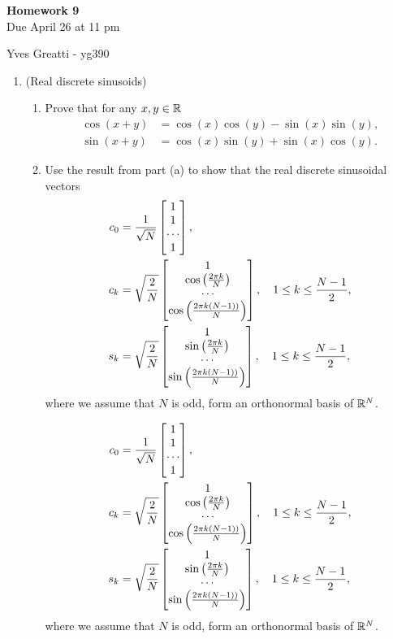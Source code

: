 \documentclass[12pt,twoside]{article}
\begin{document}
\begin{center}
{\large{\textbf{Homework 9}} } \vspace{0.2cm}\\
Due April 26 at 11 pm
\end{center}
Yves Greatti - yg390\\


\begin{enumerate}

\item (Real discrete sinusoids)

 \begin{enumerate}
 \item Prove that for any $x,y\in\mathbb{R}$
  \begin{align}
 \cos(x+y) & = \cos(x)\cos(y) - \sin(x)\sin(y) ,\\
 \sin(x+y) & = \cos(x)\sin(y) + \sin(x)\cos(y) .
 \end{align}
 \item Use the result from part (a) to show that the real discrete sinusoidal vectors
 \begin{align}
 c_0 & = \frac{1}{\sqrt{N}}\begin{bmatrix} 1 \\ 1 \\ \cdots \\ 1 \end{bmatrix},\\
c_k & = \sqrt{\frac{2}{N}}\begin{bmatrix} 1 \\ \cos \left( \frac{2 \pi k }{N} \right) \\ \cdots \\ \cos \left( \frac{2 \pi k (N-1))}{N} \right) \end{bmatrix}, \quad 1 \leq k \leq \frac{N-1}{2},\\
 s_k & = \sqrt{\frac{2}{N}}\begin{bmatrix} 1 \\ \sin \left( \frac{2 \pi k }{N} \right) \\ \cdots \\ \sin \left( \frac{2 \pi k (N-1))}{N} \right) \end{bmatrix}, \quad 1 \leq k \leq \frac{N-1}{2},
 \end{align}
 where we assume that $N$ is odd, form an orthonormal basis of $\mathbb{R}^{N}$.
 
  \begin{align}
 c_0 & = \frac{1}{\sqrt{N}}\begin{bmatrix} 1 \\ 1 \\ \cdots \\ 1 \end{bmatrix},\\
c_k & = \sqrt{\frac{2}{N}}\begin{bmatrix} 1 \\ \cos \left( \frac{2 \pi k }{N} \right) \\ \cdots \\ \cos \left( \frac{2 \pi k (N-1))}{N} \right) \end{bmatrix}, \quad 1 \leq k \leq \frac{N-1}{2},\\
 s_k & = \sqrt{\frac{2}{N}}\begin{bmatrix} 1 \\ \sin \left( \frac{2 \pi k }{N} \right) \\ \cdots \\ \sin \left( \frac{2 \pi k (N-1))}{N} \right) \end{bmatrix}, \quad 1 \leq k \leq \frac{N-1}{2},
 \end{align}
 where we assume that $N$ is odd, form an orthonormal basis of $\mathbb{R}^{N}$.\\
 

\end{enumerate}
\end{enumerate}
\end{document}
